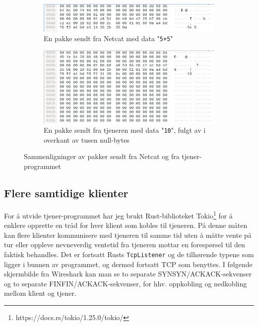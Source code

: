 \documentclass{article}
\begin{document}
\begin{figure}[h]
    \centering
    \begin{subfigure}[t]{.45\linewidth}
        \centering
        \includegraphics[width=\linewidth]{illustrasjoner/P3-fra-netcat.png}
        \caption{En pakke sendt fra Netcat med data "\texttt{5+5}"}
    \end{subfigure}
    \hfill
    \begin{subfigure}[t]{.45\linewidth}
        \centering
        \includegraphics[width=\linewidth]{illustrasjoner/P3-fra-tjener.png}
        \caption{En pakke sendt fra tjeneren med data "\texttt{10}", fulgt av i overkant av tusen null-bytes}
    \end{subfigure}

    \caption{Sammenligninger av pakker sendt fra Netcat og fra tjener-programmet}
    \label{fig:pakkesammenligning}
\end{figure}

\subsection{Flere samtidige klienter}

For å utvide tjener-programmet har jeg brukt Rust-biblioteket Tokio\footnote{https://docs.rs/tokio/1.25.0/tokio/} for å enklere opprette en tråd for hver klient som kobles til tjeneren. På denne måten kan flere klienter kommunisere med tjeneren til samme tid uten å måtte vente på tur eller oppleve nevneverdig ventetid fra tjeneren mottar en forespørsel til den faktisk behandles. Det er fortsatt Rusts \texttt{TcpListener} og de tilhørende typene som ligger i bunnen av programmet, og dermed fortsatt TCP som benyttes.
I følgende skjermbilde fra Wireshark kan man se to separate SYN\rightarrow SYN/ACK\rightarrow ACK-sekvenser og to separate FIN\rightarrow FIN/ACK\rightarrow ACK-sekvenser, for hhv. oppkobling og nedkobling mellom klient og tjener.
\end{document}
